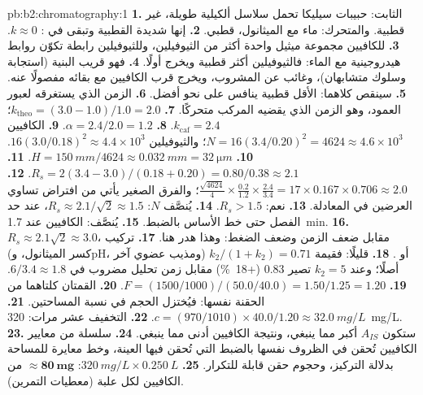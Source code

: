 \begin{solution}{pb:b2:chromatography:1}
\textbf{1.} الثابت: حبيبات سيليكا تحمل سلاسل ألكيلية طويلة، غير قطبية. والمتحرك: ماء مع
الميثانول، قطبي.
\textbf{2.} إنها شديدة القطبية وتبقى في : $k \approx 0$.
\textbf{3.} للكافيين مجموعة ميثيل واحدة أكثر من الثيوفيلين، وللثيوفيلين رابطة 
تكوّن روابط هيدروجينية مع الماء: فالثيوفيلين أكثر قطبية ويخرج أولًا.
\textbf{4.} فهو قريب البنية (استجابة وسلوك متشابهان)، وغائب عن المشروب، ويخرج
قرب الكافيين مع بقائه مفصولًا عنه.
\textbf{5.} سينقص كلاهما:  الأقل قطبية ينافس  على نحو أفضل.
\textbf{6.} الزمن الذي يستغرقه  لعبور العمود، وهو الزمن الذي يقضيه المركب متحركًا.
\textbf{7.} $k_{\mathrm{theo}} = (3.0 - 1.0)/1.0 = 2.0$؛ $k_{\mathrm{caf}} = 2.4$.
\textbf{8.} $\alpha = 2.4/2.0 = 1.2$.
\textbf{9.} الكافيين $N = 16(3.4/0.20)^2 = 4624 \approx 4.6 \times 10^3$؛ والثيوفيلين $16(3.0/0.18)^2
\approx 4.4 \times 10^3$.
\textbf{10.} $H = \qty{150}{mm}/4624 \approx \qty{0.032}{mm} = \qty{32}{\micro m}$.
\textbf{11.} $R_s = 2(3.4 - 3.0)/(0.18 + 0.20) = 0.80/0.38 \approx 2.1$.
\textbf{12.} $\frac{\sqrt{4624}}{4} \times \frac{0.2}{1.2} \times \frac{2.4}{3.4} = 17 \times 0.167 \times
0.706 \approx 2.0$؛ والفرق الصغير يأتي من افتراض تساوي العرضين في المعادلة.
\textbf{13.} نعم: $R_s > 1.5$.
\textbf{14.} يُنصَّف $N$: $R_s \approx 2.1/\sqrt2 \approx 1.5$، عند حد الفصل حتى خط الأساس بالضبط.
\textbf{15.} يُنصَّف: الكافيين عند \qty{1.7}{min}.
\textbf{16.} $R_s \approx 2.1\sqrt2 \approx 3.0$، مقابل ضعف الزمن وضعف الضغط: وهذا هدر هنا.
\textbf{17.} تركيب  (كسر الميثانول، وpH، ومذيب عضوي آخر) أو
.
\textbf{18.} قليلًا: فقيمة $k_2/(1 + k_2) = 0.71$ أصلًا؛ وعند $k_2 = 5$ تصير 0.83 (+18~\%) مقابل
زمن تحليل مضروب في $6/3.4 \approx 1.8$.
\textbf{19.} $F = (1500/1000)/(50.0/40.0) = 1.50/1.25 = 1.20$.
\textbf{20.} القمتان كلتاهما من الحقنة نفسها: فيُختزل الحجم في نسبة المساحتين.
\textbf{21.} $c = (970/1010) \times 40.0/1.20 \approx \qty{32.0}{mg/L}$.
\textbf{22.} التخفيف عشر مرات: \qty{320}{mg/L}.
\textbf{23.} ستكون $A_{IS}$ أكبر مما ينبغي، ونتيجة الكافيين أدنى مما ينبغي.
\textbf{24.} سلسلة من معايير الكافيين تُحقن في الظروف نفسها بالضبط التي تُحقن فيها العينة، 
وخط معايرة للمساحة بدلالة التركيز، وحجوم حقن قابلة للتكرار.
\textbf{25.} $\qty{320}{mg/L} \times \qty{0.250}{L}$: $\boldsymbol{\approx \qty{80}{mg}}$ من الكافيين لكل علبة (معطيات
التمرين).
\end{solution}
